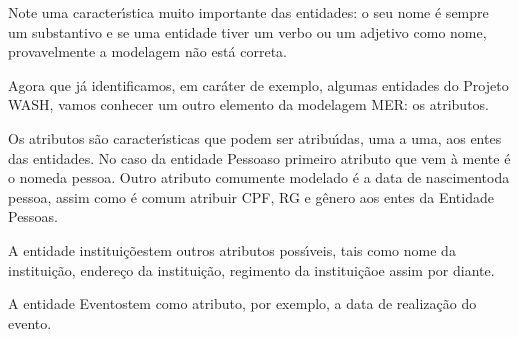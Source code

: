 \documentclass[
12pt,		%
openright,	%
twoside,  %
a4paper,			%
chapter=TITLE,		%
english,			%
french,				%
spanish,			%
brazil				%
]{USPSC-classe/USPSC_RedarTex}
\begin{document}
Note uma caracter\'{\i}stica muito importante das entidades: o seu nome \'e sempre um substantivo e se uma entidade tiver um verbo ou um adjetivo como nome, provavelmente a modelagem n\~ao est\'a correta.











\noindent\begin{center}\mbox{\centering{}}\end{center}


Agora que j\'a identificamos, em car\'ater de exemplo, algumas entidades do Projeto WASH, vamos conhecer um outro elemento da modelagem MER: os atributos.










Os atributos s\~ao caracter\'{\i}sticas que podem ser atribu\'{\i}das, uma a uma, aos entes das entidades. No caso da entidade \textquotedbl Pessoas\textquotedbl  o primeiro atributo que vem \`a mente \'e o \textquotedbl nome\textquotedbl  da pessoa. Outro atributo comumente modelado \'e a \textquotedbl data de nascimento\textquotedbl  da pessoa, assim como \'e comum atribuir CPF, RG e g\^enero aos entes da Entidade \textquotedbl Pessoas\textquotedbl .










A entidade \textquotedbl institui\c{c}\~oes\textquotedbl  tem outros atributos poss\'{\i}veis, tais como \textquotedbl nome da institui\c{c}\~ao\textquotedbl , \textquotedbl endere\c{c}o da institui\c{c}\~ao\textquotedbl , \textquotedbl regimento da institui\c{c}\~ao\textquotedbl  e assim por diante.










A entidade \textquotedbl Eventos\textquotedbl  tem como atributo, por exemplo, a data de realiza\c{c}\~ao do evento.
\end{document}
